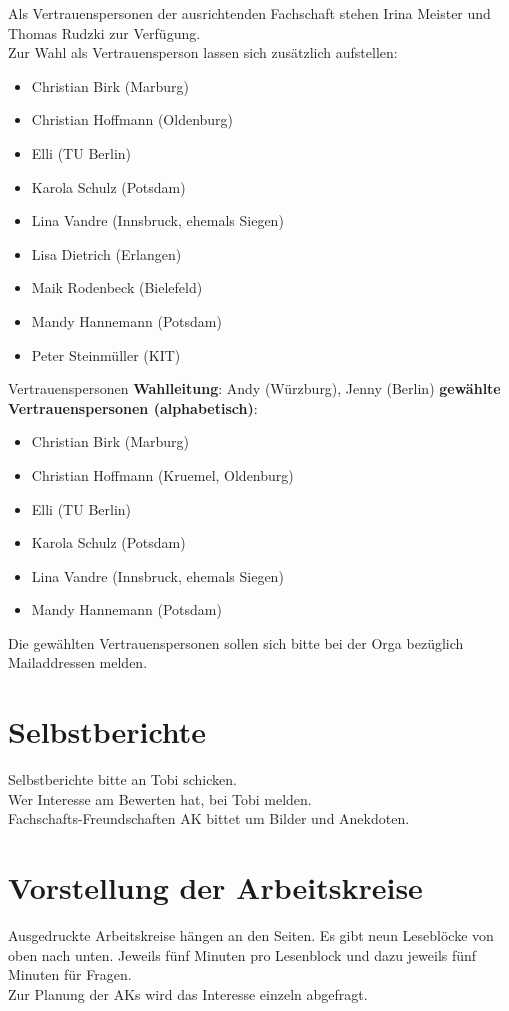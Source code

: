   Als Vertrauenspersonen der ausrichtenden Fachschaft stehen Irina Meister und Thomas Rudzki zur Verfügung. \\

  Zur Wahl als Vertrauensperson lassen sich zusätzlich aufstellen:
  \begin{itemize}
    \item Christian Birk (Marburg)
    \item Christian Hoffmann (Oldenburg)
    \item Elli (TU Berlin)
    \item Karola Schulz (Potsdam)
    \item Lina Vandre (Innsbruck, ehemals Siegen)
    \item Lisa Dietrich (Erlangen)
    \item Maik Rodenbeck (Bielefeld)
    \item Mandy Hannemann (Potsdam)
    \item Peter Steinmüller (KIT)
  \end{itemize}

  \begin{info}{Vertrauenspersonen}
    \textbf{Wahlleitung}: Andy (Würzburg), Jenny (Berlin)
    \tcblower
    \textbf{gewählte Vertrauenspersonen (alphabetisch)}:
    \begin{itemize}
      \item Christian Birk (Marburg)
      \item Christian Hoffmann (Kruemel, Oldenburg)
      \item Elli (TU Berlin)
      \item Karola Schulz (Potsdam)
      \item Lina Vandre (Innsbruck, ehemals Siegen)
      \item Mandy Hannemann (Potsdam)
    \end{itemize}
  \end{info}
  Die gewählten Vertrauenspersonen sollen sich bitte bei der Orga bezüglich Mailaddressen melden.

\section{Selbstberichte}
  Selbstberichte bitte an Tobi schicken. \\
  Wer Interesse am Bewerten hat, bei Tobi melden. \\
  Fachschafts-Freundschaften AK bittet um Bilder und Anekdoten.

\section{Vorstellung der Arbeitskreise}
  Ausgedruckte Arbeitskreise hängen an den Seiten. Es gibt neun Leseblöcke von oben nach unten. Jeweils fünf Minuten pro Lesenblock und dazu jeweils fünf Minuten für Fragen. \\
  Zur Planung der AKs wird das Interesse einzeln abgefragt.

